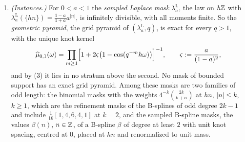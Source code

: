 \begin{proposition}
\begin{enumerate}
grid pyramid of $(w, q)$ exact in the third stratum. More generally, a symmetric law $\varrho \ne \delta_0$
carried by a lattice $\xi\ZZ$, $\xi > 0$, is a step $\mu_{s,t}$ of no fully covariant family. So
every family carrying an exact grid pyramid lies in the second stratum of
Theorem~\ref{thm:lattice-line} and not in the third: the pyramid has a covariant kernel, unique at
the knots, and no fully covariant family interpolates its levels.
\item \emph{(Instances.)} For $0 < a < 1$ the \emph{sampled Laplace mask}
$\lambda^{\mathrm{L}}_a$, the law on $h\mathbb{Z}$ with $\lambda^{\mathrm{L}}_a(\{hn\}) =
\tfrac{1-a}{1+a}a^{|n|}$, is infinitely divisible, with all moments finite. So the
\emph{geometric pyramid}, the grid pyramid of $(\lambda^{\mathrm{L}}_a, q)$, is exact for
every $q > 1$, with the unique knot kernel
\begin{equation}
\label{eq:geometric-pyramid-knot-kernel}
  \widehat\mu_{0,1}(\omega) = \prod_{m \ge 1}\Bigl[1 + 2\varsigma\bigl(1 - \cos(q^{-m}h\omega)\bigr)\Bigr]^{-1},
  \qquad \varsigma := \frac{a}{(1-a)^2},
\end{equation}
and by (3) it lies in no stratum above the second.
No mask of bounded support has an exact grid pyramid. Among these masks are two families of odd
length: the binomial masks with the weights $4^{-k}\binom{2k}{k+n}$ at $hn$, $|n| \le k$,
$k \ge 1$, which are the refinement masks of the B-splines of odd degree $2k - 1$ and include
$\tfrac1{16}[1,4,6,4,1]$ at $k = 2$, and the sampled B-spline masks, the values $\beta(n)$, $n \in \mathbb{Z}$, of a B-spline $\beta$
of degree at least $2$ with unit knot spacing, centred at $0$, placed at $hn$ and renormalized to unit
mass.
\end{enumerate}
\end{proposition}

